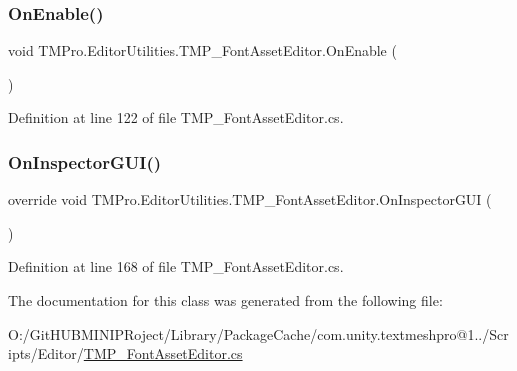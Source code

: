 \subsubsection{\texorpdfstring{OnEnable()}{OnEnable()}}
{\footnotesize\ttfamily void T\+M\+Pro.\+Editor\+Utilities.\+T\+M\+P\+\_\+\+Font\+Asset\+Editor.\+On\+Enable (\begin{DoxyParamCaption}{ }\end{DoxyParamCaption})}



Definition at line 122 of file T\+M\+P\+\_\+\+Font\+Asset\+Editor.\+cs.

\mbox{\label{class_t_m_pro_1_1_editor_utilities_1_1_t_m_p___font_asset_editor_a6252b5aae39cc04893667c96c9960881}} 
\subsubsection{\texorpdfstring{OnInspectorGUI()}{OnInspectorGUI()}}
{\footnotesize\ttfamily override void T\+M\+Pro.\+Editor\+Utilities.\+T\+M\+P\+\_\+\+Font\+Asset\+Editor.\+On\+Inspector\+G\+UI (\begin{DoxyParamCaption}{ }\end{DoxyParamCaption})}



Definition at line 168 of file T\+M\+P\+\_\+\+Font\+Asset\+Editor.\+cs.



The documentation for this class was generated from the following file\+:\begin{DoxyCompactItemize}
\item 
O\+:/\+Git\+H\+U\+B\+M\+I\+N\+I\+P\+Roject/\+Library/\+Package\+Cache/com.\+unity.\+textmeshpro@1../\+Scripts/\+Editor/\mbox{\hyperlink{_t_m_p___font_asset_editor_8cs}{T\+M\+P\+\_\+\+Font\+Asset\+Editor.\+cs}}\end{DoxyCompactItemize}
